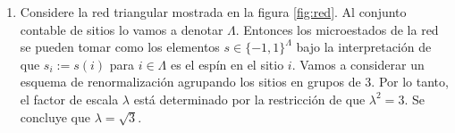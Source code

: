 \documentclass{article}
\begin{document}
\begin{enumerate}

\item Considere la red triangular mostrada en la figura \ref{fig:red}. Al conjunto contable de sitios lo vamos a denotar $\Lambda$. Entonces los microestados de la red se pueden tomar como los elementos $s\in\{-1,1\}^\Lambda$ bajo la interpretación de que $s_i:=s(i)$ para $i\in\Lambda$ es el espín en el sitio $i$. Vamos a considerar un esquema de renormalización agrupando los sitios en grupos de 3. Por lo tanto, el factor de escala $\lambda$ está determinado por la restricción de que $\lambda^2=3$. Se concluye que $\lambda=\sqrt{3}$.

\end{enumerate}



\end{document}
